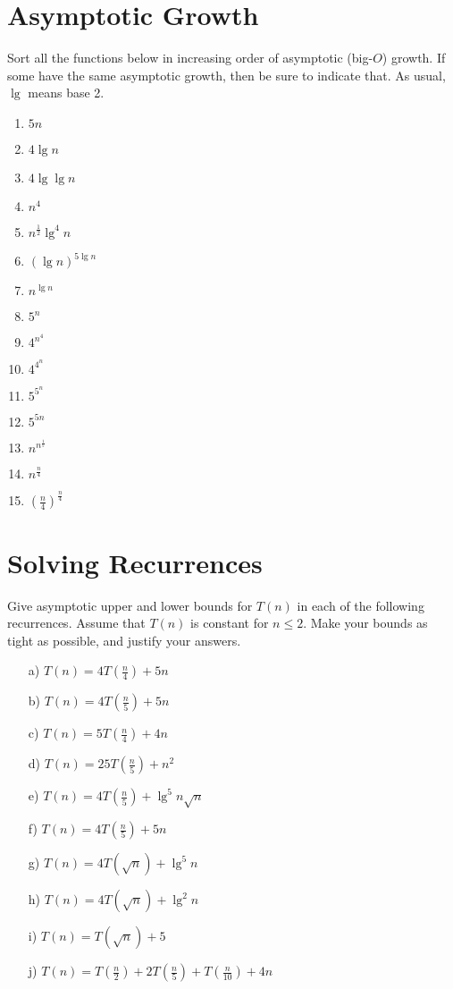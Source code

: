 \documentclass[12pt]{article}
\begin{document}
\section{Asymptotic Growth}\label{sec:asymptotic}
Sort all the functions below in increasing order of asymptotic (big-$O$) growth. If some have the
same asymptotic growth, then be sure to indicate that. As usual, $\lg$ means base 2.

\begin{enumerate}
    \item $5n$
    \item $4 \lg n$
    \item $4 \lg \lg n$
    \item $n^4$
    \item $n^{\frac{1}{2}} \lg^4 n$
    \item $(\lg n)^{5 \lg n}$
    \item $n^{\lg n}$
    \item $5^n$
    \item $4^{n^4}$
    \item $4^{4^n}$
    \item $5^{5^n}$
    \item $5^{5n}$
    \item $n^{n^{\frac{1}{5}}}$
    \item $n^{\frac{n}{4}}$
    \item $(\frac{n}{4})^{\frac{n}{4}}$
\end{enumerate}

\section{Solving Recurrences}\label{sec:recurrences}
Give asymptotic upper and lower bounds for $T(n)$ in each of the following recurrences. Assume
that $T(n)$ is constant for $n \leq 2$. Make your bounds as tight as possible, and justify your answers.

\begin{enumerate}
    \item[a)] $T(n) = 4T(\frac{n}{4}) + 5n$
    \item[b)] $T(n) = 4T(\frac{n}{5}) + 5n$
    \item[c)] $T(n) = 5T(\frac{n}{4}) + 4n$
    \item[d)] $T(n) = 25T(\frac{n}{5}) + n^2$
    \item[e)] $T(n) = 4T(\frac{n}{5}) + \lg^5 n \sqrt{n}$
    \item[f)] $T(n) = 4T(\frac{n}{5}) + 5n$
    \item[g)] $T(n) = 4T(\sqrt{n}) + \lg^5 n$
    \item[h)] $T(n) = 4T(\sqrt{n}) + \lg^2 n$
    \item[i)] $T(n) = T(\sqrt{n}) + 5$
    \item[j)] $T(n) = T(\frac{n}{2}) + 2T(\frac{n}{5}) + T(\frac{n}{10}) + 4n$
\end{enumerate}
\end{document}
